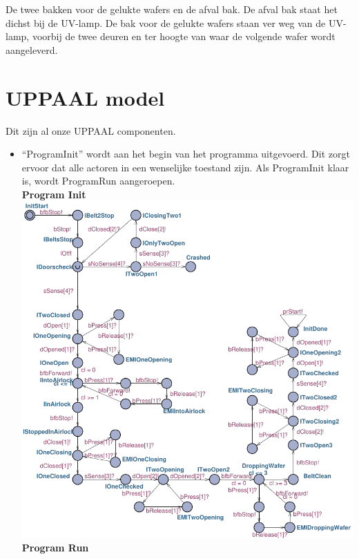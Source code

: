 De twee bakken voor de gelukte wafers en de afval bak. De afval bak staat het dichst bij de UV-lamp. De bak voor de gelukte wafers staan ver weg van de UV-lamp, voorbij de twee deuren en ter hoogte van waar de volgende wafer wordt aangeleverd.




\chapter{UPPAAL model}\label{chap:uppaal_model} %



Dit zijn al onze UPPAAL componenten.

\begin{itemize}
    \item ``ProgramInit'' wordt aan het begin van het programma uitgevoerd. Dit zorgt ervoor dat alle actoren in een wenselijke toestand zijn. Als ProgramInit klaar is, wordt ProgramRun aangeroepen. \\
    \textbf{Program Init} \\
    \includegraphics[scale=.7]{ProgramInit} \\
    \textbf{Program Run} \\

\end{itemize}
